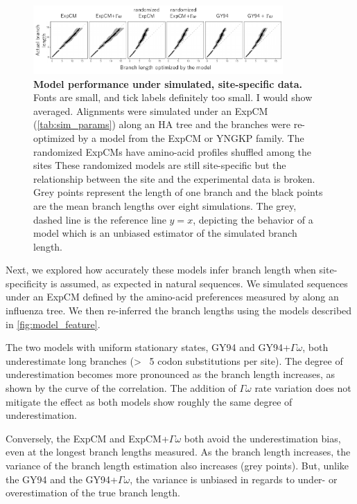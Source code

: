 \documentclass[11pt]{article}
\newcommand\jdbcomment[1]{{\color{red}#1}}
\begin{document}
\begin{figure}[H]
\centerline{\includegraphics[width=0.85\textwidth]{figures/simulations}}
\caption{\label{simulations}
\textbf{Model performance under simulated, site-specific data.} 
\jdbcomment{Fonts are small, and tick labels definitely too small. I would show averaged.}
Alignments were simulated under an ExpCM (\ref{tab:sim_params}) along an HA tree and the branches were re-optimized by a model from the ExpCM or YNGKP family. 
The randomized ExpCMs have amino-acid profiles shuffled among the sites 
These randomized models are still site-specific but the relationship between the site and the experimental data is broken. 
Grey points represent the length of one branch and the black points are the mean branch lengths over eight simulations. 
The grey, dashed line is the reference line $y=x$, depicting the behavior of a model which is an unbiased estimator of the simulated branch length. 
}
\end{figure}

Next, we explored how accurately these models infer branch length when site-specificity is assumed, as expected in natural sequences.  
We simulated sequences under an ExpCM defined by the amino-acid preferences measured by \cite{doud2016accurate} along an influenza tree. 
We then re-inferred the branch lengths using the models described in \ref{fig:model_feature}. 

The two models with uniform stationary states, GY94 and GY94+$\Gamma\omega$, both underestimate long branches (> ~5 codon substitutions per site). 
The degree of underestimation becomes more pronounced as the branch length increases, as shown by the curve of the correlation. 
The addition of $\Gamma\omega$ rate variation does not mitigate the effect as both models show roughly the same degree of underestimation. 

Conversely, the ExpCM and ExpCM+$\Gamma\omega$ both avoid the underestimation bias, even at the longest branch lengths measured. 
As the branch length increases, the variance of the branch length estimation also increases (grey points). 
But, unlike the GY94 and the GY94+$\Gamma\omega$, the variance is unbiased in regards to under- or overestimation of the true branch length. 
\end{document}
